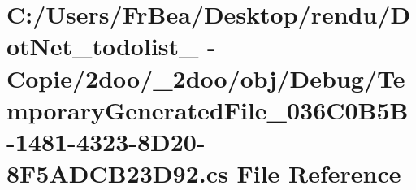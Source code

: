 \hypertarget{obj_2_debug_2_temporary_generated_file__036_c0_b5_b-1481-4323-8_d20-8_f5_a_d_c_b23_d92_8cs}{
\section{C:/Users/FrBea/Desktop/rendu/DotNet\_\-todolist\_ - Copie/2doo/\_\-2doo/obj/Debug/TemporaryGeneratedFile\_\-036C0B5B-1481-4323-8D20-8F5ADCB23D92.cs File Reference}
\label{obj_2_debug_2_temporary_generated_file__036_c0_b5_b-1481-4323-8_d20-8_f5_a_d_c_b23_d92_8cs}
}
